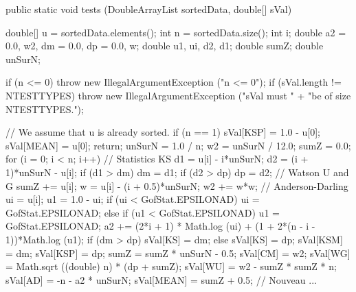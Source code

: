 \begin{code}

   public static void tests (DoubleArrayList sortedData, double[] sVal)\begin{hide} {
      double[] u = sortedData.elements();
      int n = sortedData.size();
      int i;
      double a2 = 0.0, w2, dm = 0.0, dp = 0.0, w;
      double u1, ui, d2, d1;
      double sumZ;
      double unSurN;

      if (n <= 0)
        throw new IllegalArgumentException ("n <= 0");
      if (sVal.length != NTESTTYPES)
        throw new IllegalArgumentException ("sVal must " +
                              "be of size NTESTTYPES.");

      // We assume that u is already sorted.
      if (n == 1) {
         sVal[KSP] = 1.0 - u[0];
         sVal[MEAN] = u[0];
         return;
      }
      unSurN = 1.0 / n;
      w2 = unSurN / 12.0;
      sumZ = 0.0;
      for (i = 0; i < n; i++) {
         // Statistics KS
         d1 = u[i] - i*unSurN;
         d2 = (i + 1)*unSurN - u[i];
         if (d1 > dm)
            dm = d1;
         if (d2 > dp)
            dp = d2;
         // Watson U and G
         sumZ += u[i];
         w = u[i] - (i + 0.5)*unSurN;
         w2 += w*w;
         // Anderson-Darling
         ui = u[i];
         u1 = 1.0 - ui;
         if (ui < GofStat.EPSILONAD)
            ui = GofStat.EPSILONAD;
         else if (u1 < GofStat.EPSILONAD)
            u1 = GofStat.EPSILONAD;
         a2 += (2*i + 1) * Math.log (ui) + (1 + 2*(n - i - 1))*Math.log (u1);
      }
      if (dm > dp)
         sVal[KS] = dm;
      else
         sVal[KS] = dp;
      sVal[KSM] = dm;
      sVal[KSP] = dp;
      sumZ = sumZ * unSurN - 0.5;
      sVal[CM] = w2;
      sVal[WG] = Math.sqrt ((double) n) * (dp + sumZ);
      sVal[WU] = w2 - sumZ * sumZ * n;
      sVal[AD] = -n - a2 * unSurN;
      sVal[MEAN] = sumZ + 0.5;  // Nouveau ...
   }\end{hide}
\end{code}
